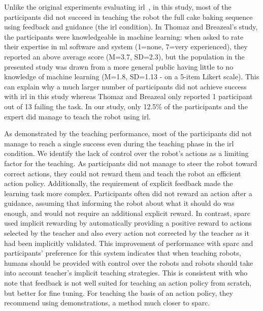 
Unlike the original experiments evaluating \gls{irl}~\citep{thomaz2008teachable}, in this study, most of the participants did not succeed in teaching the robot the full cake baking sequence using feedback and guidance (the \gls{irl} condition). In Thomaz and Breazeal's study, the participants were knowledgeable in machine learning: when asked to rate their expertise in \gls{ml} software and system (1=none, 7=very experienced), they reported an above average score (M=3.7, SD=2.3), but the population in the presented study was drawn from a more general public having little to no knowledge of machine learning (M=1.8, SD=1.13 - on a 5-item Likert scale). This can explain why a much larger number of participants did not achieve success with \gls{irl} in this study whereas Thomaz and Breazeal only reported 1 participant out of 13 failing the task. In our study, only 12.5\% of the participants and the expert did manage to teach the robot using \gls{irl}. 

As demonstrated by the teaching performance, most of the participants did not manage to reach a single success even during the teaching phase in the \gls{irl} condition. We identify the lack of control over the robot's actions as a limiting factor for the teaching. As participants did not manage to steer the robot toward correct actions, they could not reward them and teach the robot an efficient action policy. Additionally, the requirement of explicit feedback made the learning task more complex. Participants often did not reward an action after a guidance, assuming that informing the robot about what it should do was enough, and would not require an additional explicit reward. In contrast, \gls{sparc} used implicit rewarding by automatically providing a positive reward to actions selected by the teacher and also every action not corrected by the teacher as it had been implicitly validated. This improvement of performance with \gls{sparc} and participants' preference for this system indicates that when teaching robots, humans should be provided with control over the robots and robots should take into account teacher's implicit teaching strategies. This is consistent with \cite{kaochar2011towards} who note that feedback is not well suited for teaching an action policy from scratch, but better for fine tuning. For teaching the basis of an action policy, they recommend using demonstrations, a method much closer to \gls{sparc}. 


